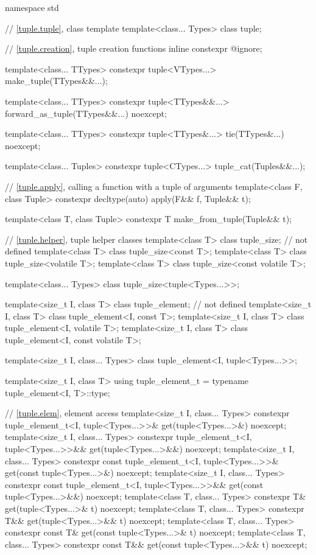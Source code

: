 %
\begin{codeblock}
namespace std {
  // \ref{tuple.tuple}, class template 
  template<class... Types>
    class tuple;

  // \ref{tuple.creation}, tuple creation functions
  inline constexpr @\unspec@ ignore;

  template<class... TTypes>
    constexpr tuple<VTypes...> make_tuple(TTypes&&...);

  template<class... TTypes>
    constexpr tuple<TTypes&&...> forward_as_tuple(TTypes&&...) noexcept;

  template<class... TTypes>
    constexpr tuple<TTypes&...> tie(TTypes&...) noexcept;

  template<class... Tuples>
    constexpr tuple<CTypes...> tuple_cat(Tuples&&...);

  // \ref{tuple.apply}, calling a function with a tuple of arguments
  template<class F, class Tuple>
    constexpr decltype(auto) apply(F&& f, Tuple&& t);

  template<class T, class Tuple>
    constexpr T make_from_tuple(Tuple&& t);

  // \ref{tuple.helper}, tuple helper classes
  template<class T> class tuple_size;                  // not defined
  template<class T> class tuple_size<const T>;
  template<class T> class tuple_size<volatile T>;
  template<class T> class tuple_size<const volatile T>;

  template<class... Types> class tuple_size<tuple<Types...>>;

  template<size_t I, class T> class tuple_element;     // not defined
  template<size_t I, class T> class tuple_element<I, const T>;
  template<size_t I, class T> class tuple_element<I, volatile T>;
  template<size_t I, class T> class tuple_element<I, const volatile T>;

  template<size_t I, class... Types>
    class tuple_element<I, tuple<Types...>>;

  template<size_t I, class T>
    using tuple_element_t = typename tuple_element<I, T>::type;

  // \ref{tuple.elem}, element access
  template<size_t I, class... Types>
    constexpr tuple_element_t<I, tuple<Types...>>& get(tuple<Types...>&) noexcept;
  template<size_t I, class... Types>
    constexpr tuple_element_t<I, tuple<Types...>>&& get(tuple<Types...>&&) noexcept;
  template<size_t I, class... Types>
    constexpr const tuple_element_t<I, tuple<Types...>>& get(const tuple<Types...>&) noexcept;
  template<size_t I, class... Types>
    constexpr const tuple_element_t<I, tuple<Types...>>&& get(const tuple<Types...>&&) noexcept;
  template<class T, class... Types>
    constexpr T& get(tuple<Types...>& t) noexcept;
  template<class T, class... Types>
    constexpr T&& get(tuple<Types...>&& t) noexcept;
  template<class T, class... Types>
    constexpr const T& get(const tuple<Types...>& t) noexcept;
  template<class T, class... Types>
    constexpr const T&& get(const tuple<Types...>&& t) noexcept;

}
\end{codeblock}
